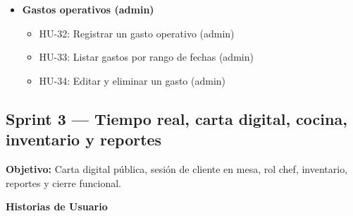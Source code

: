 \begin{itemize}[leftmargin=1.5em]
\item \textbf{Gastos operativos (admin)}

\begin{itemize}
\item HU-32: Registrar un gasto operativo (admin)
\item HU-33: Listar gastos por rango de fechas (admin)
\item HU-34: Editar y eliminar un gasto (admin)
\end{itemize}

\end{itemize}


\subsection*{Sprint 3 — Tiempo real, carta digital, cocina, inventario y reportes}

\textbf{Objetivo:}
Carta digital pública, sesión de cliente en mesa, rol chef, inventario, reportes y cierre funcional.

\textbf{Historias de Usuario}

